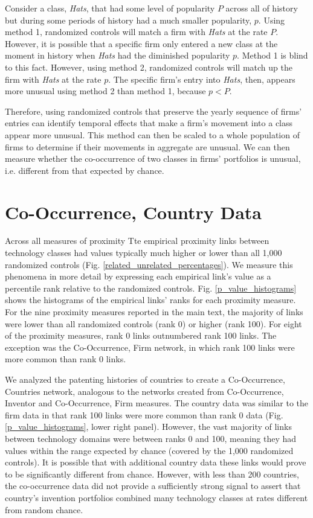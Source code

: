 \documentclass[]{svjour3}
\begin{document}
Consider a class, \textit{Hats}, that had some level of popularity $P$ across all of history but during some periods of history had a much smaller popularity, $p$. Using method 1, randomized controls will match a firm with \textit{Hats} at the rate $P$. However, it is possible that a specific firm only entered a new class at the moment in history when \textit{Hats} had the diminished popularity $p$.  Method 1 is blind to this fact. However, using method 2, randomized controls will match up the firm with \textit{Hats} at the rate $p$. The specific firm's entry into \textit{Hats}, then, appears more unusual using method 2 than method 1, because $p<P$. 

Therefore, using randomized controls that preserve the yearly sequence of firms' entries can identify temporal effects that make a firm's movement into a class appear more unusual. This method can then be scaled to a whole population of firms to determine if their movements in aggregate are unusual. We can then measure whether the co-occurrence of two classes in firms' portfolios is unusual, i.e. different from that expected by chance.


\section{Co-Occurrence, Country Data}\label{cooccurrence_country}
Across all measures of proximity Tte empirical proximity links between technology classes had values typically much higher or lower than all 1,000 randomized controls (Fig. \ref{related_unrelated_percentages}). We measure this phenomena in more detail by expressing each empirical link's value as a percentile rank relative to the randomized controls. Fig. \ref{p_value_histograms} shows the histograms of the empirical links' ranks for each proximity measure. For the nine proximity measures reported in the main text, the majority of links were lower than all randomized controls (rank 0) or higher (rank 100). For eight of the proximity measures, rank 0 links outnumbered rank 100 links. The exception was the Co-Occurrence, Firm network, in which rank 100 links were more common than rank 0 links.

We analyzed the patenting histories of countries to create a Co-Occurrence, Countries network, analogous to the networks created from Co-Occurrence, Inventor and Co-Occurrence, Firm measures. The country data was similar to the firm data in that rank 100 links were more common than rank 0 data (Fig. \ref{p_value_histograms}, lower right panel). However, the vast majority of links between technology domains were between ranks 0 and 100, meaning they had values within the range expected by chance (covered by the 1,000 randomized controls). It is possible that with additional country data these links would prove to be significantly different from chance. However, with less than 200 countries, the co-occurrence data did not provide a sufficiently strong signal to assert that country's invention portfolios combined many technology classes at rates different from random chance.
\end{document}
